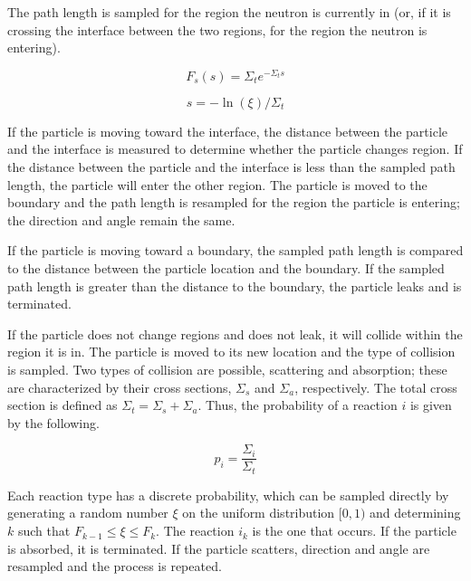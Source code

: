 \documentclass[11pt, oneside]{article}   	%
\begin{document}
The path length is sampled for the region the neutron is currently in (or, if it is crossing the interface between the two regions, for the region the neutron is entering).
 
\begin{equation}
F_s(s)=\Sigma_t e^{-\Sigma_ts}
\end{equation}

\begin{equation}
s = -\ln(\xi)/\Sigma_t
\end{equation}

If the particle is moving toward the interface, the distance between the particle and the interface is measured to determine whether the particle changes region. If the distance between the particle and the interface is less than the sampled path length, the particle will enter the other region. The particle is moved to the boundary and the path length is resampled for the region the particle is entering; the direction and angle remain the same.

If the particle is moving toward a boundary, the sampled path length is compared to the distance between the particle location and the boundary. If the sampled path length is greater than the distance to the boundary, the particle leaks and is terminated. 

If the particle does not change regions and does not leak, it will collide within the region it is in. The particle is moved to its new location and the type of collision is sampled. Two types of collision are possible, scattering and absorption; these are characterized by their cross sections, $\Sigma_{s}$ and $\Sigma_{a}$, respectively. The total cross section is defined as $\Sigma_{t}=\Sigma_{s} + \Sigma_{a}$. Thus, the probability of a reaction $i$ is given by the following.

\begin{equation}
p_{i} = \frac{\Sigma_{i}}{\Sigma_{t}}
\end{equation}

Each reaction type has a discrete probability, which can be sampled directly by generating a random number $\xi$ on the uniform distribution $[0,1)$ and determining $k$ such that $F_{k-1} \leq \xi \leq F_{k}$. The reaction $i_{k}$ is the one that occurs. If the particle is absorbed, it is terminated. If the particle scatters, direction and angle are resampled and the process is repeated.
\end{document}
